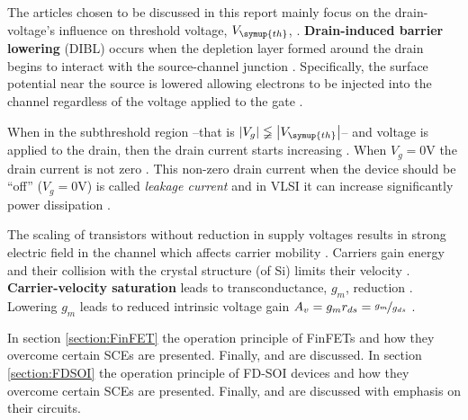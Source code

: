 		The articles chosen to be discussed in this report mainly focus on the drain-voltage's influence on threshold voltage, $V_{\symup{th}}$, \cite{MOSFETArora}. \textbf{Drain-induced barrier lowering} (DIBL) occurs when the depletion layer formed around the drain begins to interact with the source-channel junction \cite{YangMicroelectronics}. Specifically, the surface potential near the source is lowered \cite{MOSFETArora} allowing electrons to be injected into the channel regardless of the voltage applied to the gate \cite{YangMicroelectronics}.

		When in the subthreshold region --that is $\left| V_{g} \right| \lneqq \left| V_{\symup{th}} \right|$-- and voltage is applied to the drain, then the drain current starts increasing \cite{FDSOICMOS}. When $V_{g}=0\unit{\volt}$ the drain current is not zero \cite{FDSOICMOS}\cite{KURINEC20015461}\cite{AGARWAL202381}\cite{FjeldlyVthModeling}. This non-zero drain current when the device should be ``off'' ($V_{g}=0\unit{\volt}$) is called \textsl{leakage current} and in VLSI it can increase significantly power dissipation \cite{KURINEC20015461}\cite{AGARWAL202381}.\par

	   The scaling of transistors without reduction in supply voltages results in strong electric field in the channel \cite{Brennan_2005} which affects carrier mobility \cite{YangMicroelectronics}. Carriers gain energy and their collision with the crystal structure (of Si) limits their velocity \cite{YangMicroelectronics}. \textbf{Carrier-velocity saturation} leads to transconductance, $g_m$, reduction \cite{YangMicroelectronics}. Lowering $g_m$ leads to reduced intrinsic voltage gain $A_v=g_m r_{ds}=\nicefrac{g_m}{g_{ds}}$ \cite{SedraSmith}\cite{nazarov_functional_2014}.\par

		In section \ref{section:FinFET} the operation principle of FinFETs and how they overcome certain SCEs are presented. Finally, \cite{FinFET1} and \cite{FinFET2} are discussed. In section \ref{section:FDSOI} the operation principle of FD-SOI devices and how they overcome certain SCEs are presented. Finally, \cite{FDSOI1} and \cite{FDSOI2} are discussed with emphasis on their circuits.\par

	
	

	\ifCLASSOPTIONcaptionsoff
		\newpage
	\fi

	\printbibliography
